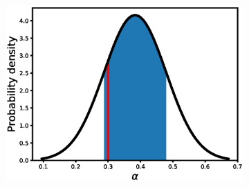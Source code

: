 \documentclass[12pt, table]{article}
\begin{document}
\begin{figure}[H]

   \centering
   \begin{subfigure}[b]{0.45\textwidth}
       \includegraphics[width=1\textwidth, height=0.24\textheight]{figexple3/fgb}
      

\end{subfigure}
\end{figure}
\end{document}
